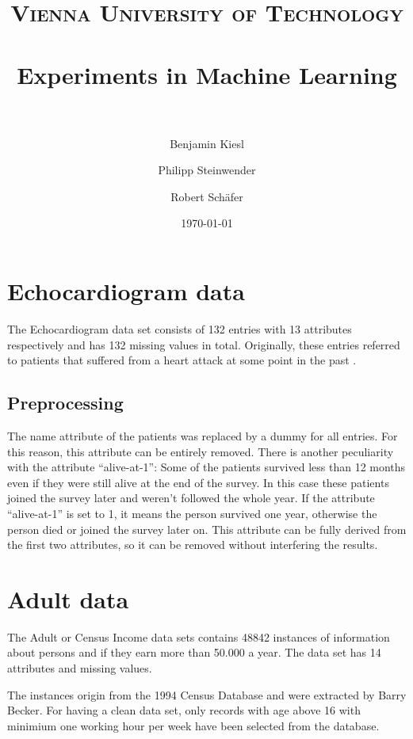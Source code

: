 \documentclass[paper=a4, fontsize=11pt]{scrartcl} %
\title{ 
\normalfont \normalsize 
\textsc{Vienna University of Technology} \\ [25pt] %
\horrule{0.5pt} \\[0.4cm] %
\huge Experiments in Machine Learning \\ %
\horrule{2pt} \\[0.5cm] %
}
\author{Benjamin Kiesl \and Philipp Steinwender \and Robert Sch\"{a}fer} %
\date{\normalsize\today} %
\numberwithin{equation}{section} %
\numberwithin{figure}{section} %
\numberwithin{table}{section} %
\begin{document}
\maketitle %


\section{Echocardiogram data}

The Echocardiogram data set consists of 132 entries with 13 attributes respectively and has 132 missing values in total. Originally, these entries referred to patients that suffered from a heart attack at some point in the past \cite{uci-repo}. 

\subsection{Preprocessing}
The name attribute of the patients was replaced by a dummy for all entries. For this reason, this attribute can be entirely removed. There is another peculiarity with the attribute ``alive-at-1'': Some of the patients survived less than 12 months even if they were still alive at the end of the survey. In this case these patients joined the survey later and weren't followed the whole year. If the attribute ``alive-at-1'' is set to 1, it means the person survived one year, otherwise the person died or joined the survey later on. This attribute can be fully derived from the first two attributes, so it can be removed without interfering the results.



\section{Adult data}

The Adult or Census Income data sets contains 48842 instances of information about persons and if they earn more than 50.000 a year. The data set has 14 attributes and missing values.

The instances origin from the 1994 Census Database and were extracted by Barry Becker. For having a clean data set, only records with age above 16 with minimium one working hour per week have been selected from the database.
\end{document}
